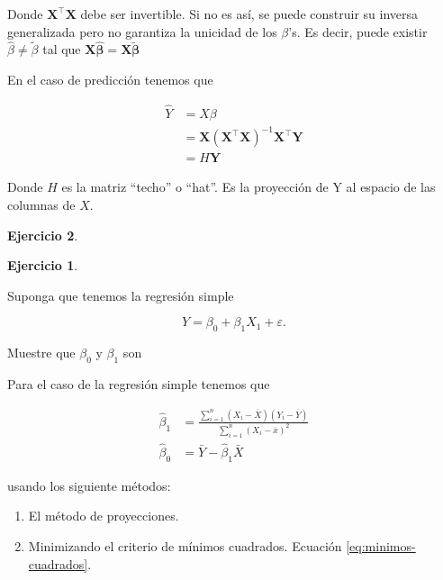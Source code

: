 \documentclass[
  12pt,
]{book}
\providecommand{\tightlist}{%
  \setlength{\itemsep}{0pt}\setlength{\parskip}{0pt}}
\theoremstyle{definition}
\theoremstyle{definition}
\theoremstyle{definition}
\newtheorem{exercise}{Ejercicio}[chapter]
\theoremstyle{remark}
\begin{document}
Donde \(\boldsymbol{X}^{\top} \boldsymbol{X}\) debe ser invertible. Si no es así, se puede construir su inversa generalizada pero no garantiza la unicidad de los \(\beta\)'s. Es decir, puede existir \(\hat{\beta} \neq \tilde{\beta}\) tal que \(\boldsymbol{X}\boldsymbol{\hat{\beta}} = \boldsymbol{X}\boldsymbol{\tilde{\beta}}\)

En el caso de predicción tenemos que

\begin{align*}
\hat{Y} &=  X\beta \\
&= \boldsymbol{X}(\boldsymbol{X}^{\top} \boldsymbol{X})^{-1} \boldsymbol{X}^{\top}\boldsymbol{Y} \\
&=  H \boldsymbol{Y} 
\end{align*}

Donde \(H\) es la matriz ``techo'' o ``hat''. Es la proyección de Y al espacio de las columnas de \(X\).

\begin{exercise}
\begin{exercise}
\protect\hypertarget{exr:unlabeled-div-45}{}\label{exr:unlabeled-div-45}

\protect\hypertarget{exr:unnamed-chunk-170}{}{\label{exr:unnamed-chunk-170} }Suponga que tenemos la regresión simple

\begin{equation*}
Y = \beta_{0} + \beta_{1}X_{1}+\varepsilon.
\end{equation*}

Muestre que \(\beta_{0}\) y \(\beta_{1}\) son

Para el caso de la regresión simple tenemos que

\begin{align*}
\hat{\beta}_{1}&= \frac{\sum_{i=1}^{n}\left(X_{i}-\overline{X}\right)\left(Y_{i}-\overline{Y}\right)}{\sum_{i=1}^{n}\left(X_{i}-\overline{x}\right)^{2}} \\ 
\hat{\beta}_{0}&= \bar{Y}-\widehat{\beta}_{1} \bar{X}
\end{align*}

usando los siguiente métodos:

\begin{enumerate}
\def\labelenumi{\arabic{enumi}.}
\tightlist
\item
  El método de proyecciones.
\item
  Minimizando el criterio de mínimos cuadrados. Ecuación \eqref{eq:minimos-cuadrados}.
\end{enumerate}

\end{exercise}
\end{exercise}
\end{document}
